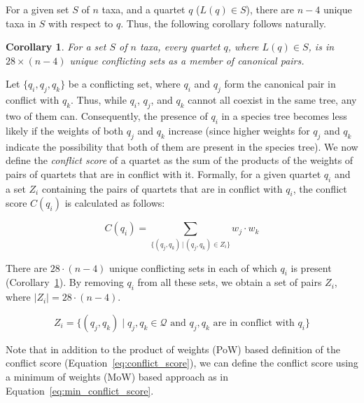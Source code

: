 \documentclass[10pt,a4paper]{article}
\newtheorem{corollary}{Corollary}[theorem]
\begin{document}
For a given set $S$ of $n$ taxa, and a quartet $q$ ($L(q) \in S$), there are $n-4$ unique taxa in $S$ with respect to $q$. Thus, the following corollary follows naturally.

\begin{corollary}
\label{cor:total_unique_conflict}
For a set $S$ of $n$ taxa, every quartet $q$, where $L(q) \in S$, is in $28 \times (n-4)$ unique conflicting sets as a member of canonical pairs.
\end{corollary}



Let $ \{q_i, q_j, q_k \} $ be a conflicting set, where $q_i$ and $q_j$ form the canonical pair in conflict with $q_k$. Thus, while $q_i$, $q_j$, and $q_k$ cannot all coexist in the same tree, any two of them can. Consequently, the presence of $q_i$ in a species tree becomes less likely if the weights of both $q_j$ and $q_k$ increase (since higher weights for $q_j$ and $q_k$ indicate the possibility that both of them are present in the species tree). We now define the \textit{conflict score} of a quartet as the sum of the products of the weights of pairs of quartets that are in conflict with it. Formally, for a given quartet $q_i$ and a set $Z_i$ containing the pairs of quartets that are in conflict with $q_i$, the conflict score $C(q_i)$ is calculated as follows:

\vspace{-10pt}
\begin{equation}
\label{eq:conflict_score}
C(q_i) = \sum_{\{(q_j, q_k) \,|\, (q_j, q_k) \in Z_i\}} w_j \cdot w_k
\end{equation}

There are $28 \cdot (n - 4)$ unique conflicting sets in each of which $q_i$ is present (Corollary~\ref{cor:total_unique_conflict}). By removing  $q_i$ from all these sets, we obtain a set of pairs $Z_i$, where $|Z_i| = 28 \cdot (n-4)$. %


$$
Z_i = \{(q_j, q_k) \mid q_j, q_k \in \mathcal{Q} \text{ and } q_j, q_k \text{ are in conflict with } q_i\}
$$

%


Note that in addition to the product of weights (PoW) based definition of the conflict score (Equation~\ref{eq:conflict_score}), we can define the conflict score using a minimum of weights (MoW) based approach as in Equation~\ref{eq:min_conflict_score}. %
\end{document}
